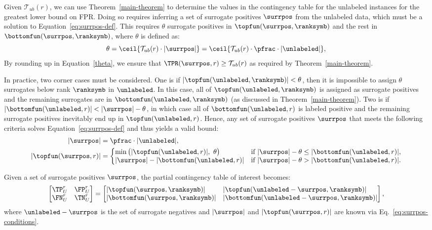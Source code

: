 Given $\mathcal{T}_{ub}(r)$, we can use Theorem~\ref{main-theorem} to determine the values in the contingency table for the unlabeled instances for the greatest lower bound on FPR. Doing so requires inferring a set of surrogate positives $\surrpos$ from the unlabeled data, which must be a solution to Equation~\eqref{eq:surrpos-def}. This requires $\theta$ surrogate positives in $\topfun(\surrpos,\ranksymb)$ and the rest in $\bottomfun(\surrpos,\ranksymb)$, where $\theta$ is defined as:
\begin{equation}
\theta = \ceil{\mathcal{T}_{ub}(r) \cdot |\surrpos|} = \ceil{\mathcal{T}_{ub}(r) \cdot \pfrac \cdot |\unlabeled|}, \label{theta}
\end{equation}
By rounding up in Equation~\eqref{theta}, we ensure that $\TPR(\surrpos, r) \geq \mathcal{T}_{ub}(r)$ as required by Theorem~\ref{main-theorem}. 

In practice, two corner cases must be considered. One is if $|\topfun(\unlabeled,\ranksymb)| < \theta$, then it is impossible to assign $\theta$ surrogates below rank $\ranksymb$ in $\unlabeled$. In this case, all of $\topfun(\unlabeled,\ranksymb)$ is assigned as surrogate positives and the remaining surrogates are in $\bottomfun(\unlabeled,\ranksymb)$ (as discussed in Theorem~\ref{main-theorem}). 
Two is if $|\bottomfun(\unlabeled, r)| < |\surrpos| - \theta$, in which case all of $\bottomfun(\unlabeled, r)$ is labeled positive and the remaining surrogate positives inevitably end up in $\topfun(\unlabeled, r)$. Hence, any set of surrogate positives $\surrpos$ that meets the following criteria solves Equation~\eqref{eq:surrpos-def} and thus yields a valid bound:
\begin{align}
|\surrpos| &= \pfrac \cdot |\unlabeled|, \nonumber \\
|\topfun(\surrpos,r)| &= 
\left\{\begin{matrix*}[l] 
\min\big(|\topfun(\unlabeled, r)|,\ \theta\big) &\text{if } |\surrpos|-\theta \leq |\bottomfun(\unlabeled, r)|, \\
|\surrpos| - |\bottomfun(\unlabeled, r)| &\text{if } |\surrpos|-\theta > |\bottomfun(\unlabeled, r)|.
\end{matrix*}\right. \label{eq:surrpos-conditions}
\end{align}

Given a set of surrogate positives $\surrpos$, the partial contingency table of interest becomes:
\begin{equation}
\begin{bmatrix}
\TP_{U}^r & \FP_{U}^r\\
\FN_{U}^r & \TN_{U}^r
\end{bmatrix} = 
\begin{bmatrix*}[l]
|\topfun(\surrpos,\ranksymb)| 		& |\topfun(\unlabeled-\surrpos,\ranksymb)|\\
|\bottomfun(\surrpos,\ranksymb)| 	& |\bottomfun(\unlabeled-\surrpos,\ranksymb)|
\end{bmatrix*}, \label{eq:partial-ct-unlabeled}
\end{equation}
where $\unlabeled-\surrpos$ is the set of surrogate negatives and $|\surrpos|$ and $|\topfun(\surrpos,r)|$ are known via Eq.~\ref{eq:surrpos-conditions}. 

